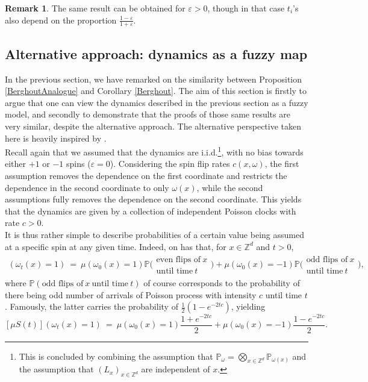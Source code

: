 \documentclass[12pt]{article}
\renewcommand{\P}{\mathbb{P}}
\newcommand{\Z}{\mathbb{Z}}
\newcommand{\1}{\mathbbm{1}}
\newcommand{\5}{\vspace{0.5cm}}
\theoremstyle{definition}
\newtheorem{rem}[thm]{Remark}
\begin{document}
\begin{rem}
The same result can be obtained for $\varepsilon>0$, though in that case $t_i$'s also depend on the proportion $\frac{1-\varepsilon}{1+\varepsilon}$.
\end{rem}


\subsection{Alternative approach: dynamics as a fuzzy map}

In the previous section, we have remarked on the similarity between Proposition \ref{BerghoutAnalogue} and Corollary \ref{Berghout}. The aim of this section is firstly to argue that one can view the dynamics described in the previous section as a fuzzy model, and secondly to demonstrate that the proofs of those same results are very similar, despite the alternative approach. The alternative perspective taken here is heavily inspired by \cite{Ver}. \\

Recall again that we assumed that the dynamics are i.i.d.\footnote{This is concluded by combining the assumption that $\P_\omega=\bigotimes_{x\in\Z^d}\P_{\omega(x)}$ and the assumption that $(L_x)_{x\in\Z^d}$ are independent of $x$.}, with no bias towards either $+1$ or $-1$ spins ($\varepsilon=0$). Considering the spin flip rates $c(x,\omega)$, the first assumption removes the dependence on the first coordinate and restricts the dependence in the second coordinate to only $\omega(x)$, while the second assumptions fully removes the dependence on the second coordinate. This yields that the dynamics are given by a collection of independent Poisson clocks with rate $c>0$. \\

It is thus rather simple to describe probabilities of a certain value being assumed at a specific spin at any given time. Indeed, on has that, for $x\in\Z^d$ and $t>0$,
\begin{align*}
[\mu S(t)](\omega_t(x)=1) ~=~ \mu(\omega_0(x)=1)\P\big(\substack{\text{even flips of}~x\\\text{until time}~t}\big) + \mu(\omega_0(x)=-1)\P\big(\substack{\text{odd flips of}~x\\\text{until time}~t}\big),
\end{align*}
where $\P(\text{odd flips of}~x~\text{until time}~t)$ of course corresponds to the probability of there being odd number of arrivals of Poisson process with intensity $c$ until time $t$. Famously, the latter carries the probability of $\frac{1}{2}(1-e^{-2tc})$, yielding
$$[\mu S(t)](\omega_t(x)=1) ~=~ \mu(\omega_0(x)=1)\frac{1+e^{-2tc}}{2} + \mu(\omega_0(x)=-1)\frac{1-e^{-2tc}}{2}.$$
\end{document}
